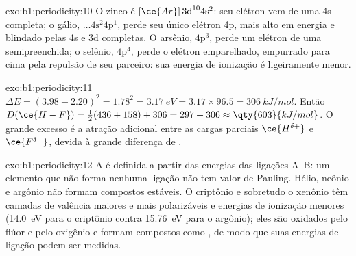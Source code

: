 \begin{solution}{exo:b1:periodicity:10}
O zinco é $[\ce{Ar}]\,3\text{d}^{10} 4\text{s}^2$: seu elétron vem de uma
 4s completa; o gálio, $\dots 4\text{s}^2 4\text{p}^1$, perde seu
único elétron 4p, mais alto em energia e blindado pelas  4s e 3d
completas. O arsênio, $4\text{p}^3$, perde um elétron de uma 
semipreenchida; o selênio, $4\text{p}^4$, perde o elétron emparelhado,
empurrado para cima pela repulsão de seu parceiro: sua energia de
ionização é ligeiramente menor.
\end{solution}

\begin{solution}{exo:b1:periodicity:11}
$\Delta E = (3.98 - 2.20)^2 = 1.78^2 = \qty{3.17}{eV} = 3.17 \times 96.5 =
\qty{306}{kJ/mol}$. Então $D(\ce{H-F}) = \tfrac12(436 + 158) + 306 = 297 +
306 \approx \qty{603}{kJ/mol}$. O grande excesso é a atração adicional
entre as cargas parciais $\ce{H^{\delta+}}$ e $\ce{F^{\delta-}}$, devida
à grande diferença de .
\end{solution}

\begin{solution}{exo:b1:periodicity:12}
A  é definida a partir das energias das ligações A--B:
um elemento que não forma nenhuma ligação não tem valor de Pauling. Hélio,
neônio e argônio não formam compostos estáveis. O criptônio e sobretudo o
xenônio têm camadas de valência maiores e mais polarizáveis e energias de
ionização menores (\qty{14.0}{eV} para o criptônio contra \qty{15.76}{eV}
para o argônio); eles são oxidados pelo flúor e pelo oxigênio e formam
compostos como , de modo que suas energias de ligação podem ser
medidas.
\end{solution}

